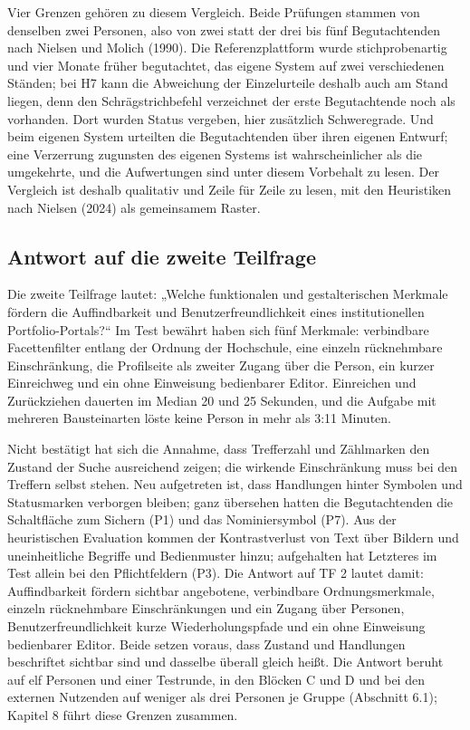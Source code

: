 Vier Grenzen gehören zu diesem Vergleich. Beide Prüfungen stammen von denselben zwei Personen, also von zwei statt der drei bis fünf Begutachtenden nach Nielsen und Molich (1990). Die Referenzplattform wurde stichprobenartig und vier Monate früher begutachtet, das eigene System auf zwei verschiedenen Ständen; bei H7 kann die Abweichung der Einzelurteile deshalb auch am Stand liegen, denn den Schrägstrichbefehl verzeichnet der erste Begutachtende noch als vorhanden. Dort wurden Status vergeben, hier zusätzlich Schweregrade. Und beim eigenen System urteilten die Begutachtenden über ihren eigenen Entwurf; eine Verzerrung zugunsten des eigenen Systems ist wahrscheinlicher als die umgekehrte, und die Aufwertungen sind unter diesem Vorbehalt zu lesen. Der Vergleich ist deshalb qualitativ und Zeile für Zeile zu lesen, mit den Heuristiken nach Nielsen (2024) als gemeinsamem Raster.

\subsection{Antwort auf die zweite Teilfrage}

Die zweite Teilfrage lautet: „Welche funktionalen und gestalterischen Merkmale fördern die Auffindbarkeit und Benutzerfreundlichkeit eines institutionellen Portfolio-Portals?“ Im Test bewährt haben sich fünf Merkmale: verbindbare Facettenfilter entlang der Ordnung der Hochschule, eine einzeln rücknehmbare Einschränkung, die Profilseite als zweiter Zugang über die Person, ein kurzer Einreichweg und ein ohne Einweisung bedienbarer Editor. Einreichen und Zurückziehen dauerten im Median 20 und 25 Sekunden, und die Aufgabe mit mehreren Bausteinarten löste keine Person in mehr als 3:11 Minuten.

Nicht bestätigt hat sich die Annahme, dass Trefferzahl und Zählmarken den Zustand der Suche ausreichend zeigen; die wirkende Einschränkung muss bei den Treffern selbst stehen. Neu aufgetreten ist, dass Handlungen hinter Symbolen und Statusmarken verborgen bleiben; ganz übersehen hatten die Begutachtenden die Schaltfläche zum Sichern (P1) und das Nominiersymbol (P7). Aus der heuristischen Evaluation kommen der Kontrastverlust von Text über Bildern und uneinheitliche Begriffe und Bedienmuster hinzu; aufgehalten hat Letzteres im Test allein bei den Pflichtfeldern (P3). Die Antwort auf TF 2 lautet damit: Auffindbarkeit fördern sichtbar angebotene, verbindbare Ordnungsmerkmale, einzeln rücknehmbare Einschränkungen und ein Zugang über Personen, Benutzerfreundlichkeit kurze Wiederholungspfade und ein ohne Einweisung bedienbarer Editor. Beide setzen voraus, dass Zustand und Handlungen beschriftet sichtbar sind und dasselbe überall gleich heißt. Die Antwort beruht auf elf Personen und einer Testrunde, in den Blöcken C und D und bei den externen Nutzenden auf weniger als drei Personen je Gruppe (Abschnitt 6.1); Kapitel 8 führt diese Grenzen zusammen.

